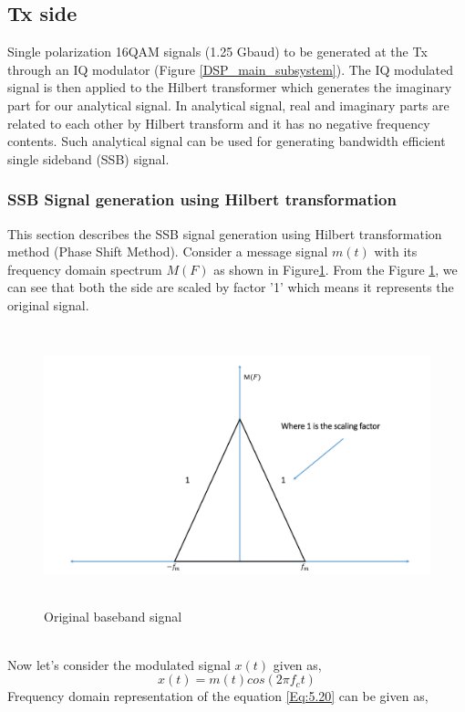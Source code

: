 \subsection{Tx side}
Single polarization 16QAM signals (1.25 Gbaud) to be generated at the Tx through an IQ modulator (Figure \ref{DSP_main_subsystem}). The IQ modulated signal is then applied to the Hilbert transformer which generates the imaginary part for our analytical signal. In analytical signal, real and imaginary parts are related to each other by Hilbert transform and it has no negative frequency contents. Such analytical signal can be used for generating bandwidth efficient single sideband (SSB) signal.
\subsubsection{SSB Signal generation using Hilbert transformation}
This section describes the SSB signal generation using Hilbert transformation method (Phase Shift Method). Consider a message signal $m(t)$ with its frequency domain spectrum $M(F)$ as shown in Figure\ref{Original_baseband_signal}. From the Figure \ref{Original_baseband_signal}, we can see that both the side are scaled by factor '1' which means it represents the original signal.
\begin{figure}[h]
	\centering
	\includegraphics[width=1.0\textwidth, height=8cm]{./sdf/simplified_coherent_receiver/figures/SSB1.pdf}
	\caption{Original baseband signal}\label{Original_baseband_signal}
\end{figure}\\ 	
Now let's consider the modulated signal $x(t)$ given as,
\begin{equation}
x(t)=m(t) cos(2\pi f_c t)
\label{Eq:5.20}
\end{equation}
Frequency domain representation of the equation \ref{Eq:5.20} can be given as,
